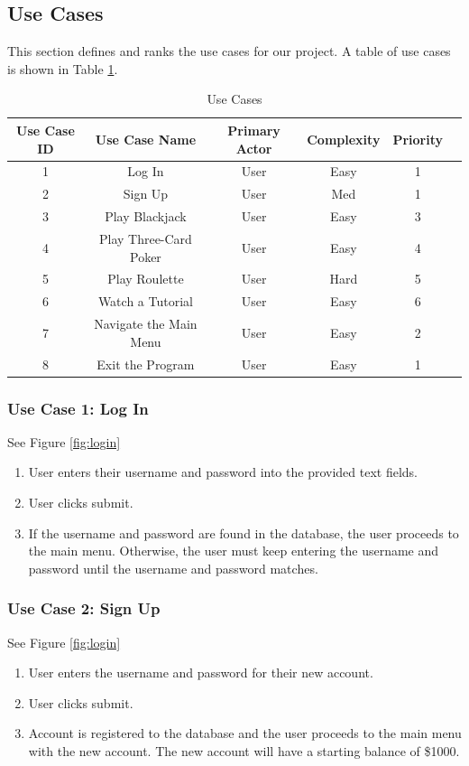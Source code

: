 \documentclass[10pt,conference,onecolumn,compsoc]{IEEEtran}
\begin{document}
\subsection{Use Cases}
This section defines and ranks the use cases for our project. A table of use cases is shown in Table \ref{tab:useCaseIndex}.

\begin{table}
\centering
\begin{tabular}{|c|c|c|c|c|c|}
\hline
Use Case ID & Use Case Name & Primary Actor & Complexity & Priority \\
\hline \hline
1 & Log In & User & Easy & 1\\
\hline
2 & Sign Up & User & Med & 1\\
\hline
3 & Play Blackjack & User & Easy & 3\\
\hline
4 & Play Three-Card Poker & User & Easy & 4\\
\hline
5 & Play Roulette & User & Hard & 5\\
\hline
6 & Watch a Tutorial & User & Easy & 6\\
\hline
7 & Navigate the Main Menu & User & Easy & 2\\
\hline
8 & Exit the Program & User & Easy & 1\\
\hline
\end{tabular}
\caption{Use Cases}
\label{tab:useCaseIndex}
\end{table}

\subsubsection{Use Case 1: Log In}
See Figure \ref{fig:login}
\begin{enumerate}
\item User enters their username and password into the provided text fields.
\item User clicks submit.
\item If the username and password are found in the database, the user proceeds to the main menu. Otherwise, the user must keep entering the username and password until the username and password matches.
\end{enumerate}

\subsubsection{Use Case 2: Sign Up}
See Figure \ref{fig:login}
\begin{enumerate}
\item User enters the username and password for their new account.
\item User clicks submit.
\item Account is registered to the database and the user proceeds to the main menu with the new account. The new account will have a starting balance of \$1000.
\end{enumerate}
\end{document}

